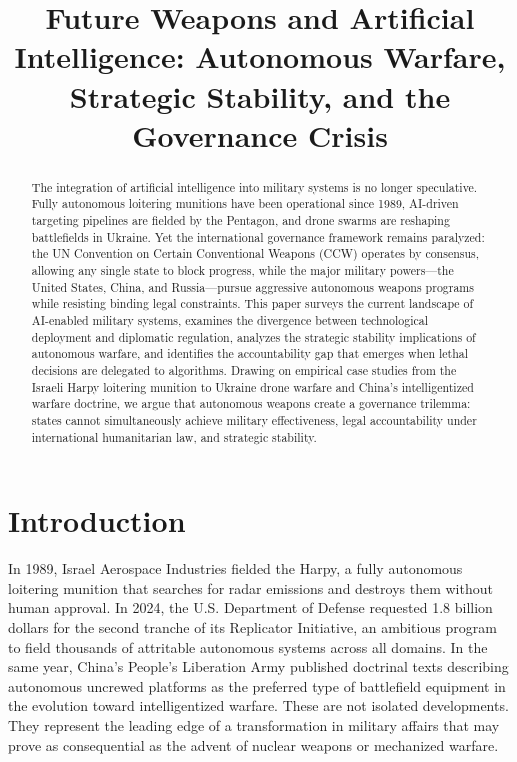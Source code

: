 \documentclass[11pt,a4paper]{article}
\title{Future Weapons and Artificial Intelligence: Autonomous Warfare, Strategic Stability, and the Governance Crisis}
\author{}
\date{}
\begin{document}
\maketitle

\begin{abstract}
The integration of artificial intelligence into military systems is no longer speculative. Fully autonomous loitering munitions have been operational since 1989, AI-driven targeting pipelines are fielded by the Pentagon, and drone swarms are reshaping battlefields in Ukraine. Yet the international governance framework remains paralyzed: the UN Convention on Certain Conventional Weapons (CCW) operates by consensus, allowing any single state to block progress, while the major military powers---the United States, China, and Russia---pursue aggressive autonomous weapons programs while resisting binding legal constraints. This paper surveys the current landscape of AI-enabled military systems, examines the divergence between technological deployment and diplomatic regulation, analyzes the strategic stability implications of autonomous warfare, and identifies the accountability gap that emerges when lethal decisions are delegated to algorithms. Drawing on empirical case studies from the Israeli Harpy loitering munition to Ukraine drone warfare and China's intelligentized warfare doctrine, we argue that autonomous weapons create a governance trilemma: states cannot simultaneously achieve military effectiveness, legal accountability under international humanitarian law, and strategic stability.
\end{abstract}

\section{Introduction}

In 1989, Israel Aerospace Industries fielded the Harpy, a fully autonomous loitering munition that searches for radar emissions and destroys them without human approval. In 2024, the U.S. Department of Defense requested 1.8 billion dollars for the second tranche of its Replicator Initiative, an ambitious program to field thousands of attritable autonomous systems across all domains. In the same year, China's People's Liberation Army published doctrinal texts describing autonomous uncrewed platforms as the preferred type of battlefield equipment in the evolution toward intelligentized warfare. These are not isolated developments. They represent the leading edge of a transformation in military affairs that may prove as consequential as the advent of nuclear weapons or mechanized warfare.
\end{document}
